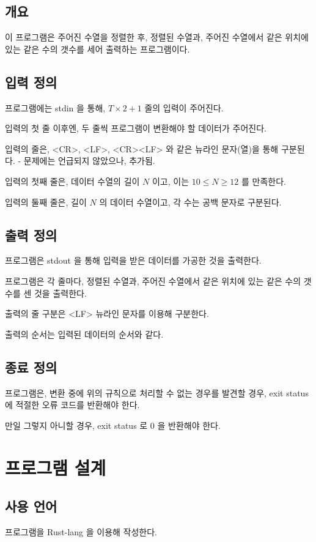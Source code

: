 \documentclass {article}
\begin{document}
\subsection {개요}
이 프로그램은 주어진 수열을 정렬한 후, 정렬된 수열과, 주어진 수열에서 같은 위치에 있는 같은 수의 갯수를 세어 출력하는 프로그램이다.

\subsection {입력 정의}
프로그램에는 stdin 을 통해, $T \times 2 + 1$ 줄의 입력이 주어진다.

입력의 첫 줄 이후엔, 두 줄씩 프로그램이 변환해야 할 데이터가 주어진다.

입력의 줄은, <CR>, <LF>, <CR><LF> 와 같은 뉴라인 문자(열)을 통해 구분된다. - 문제에는 언급되지 않았으나, 추가됨.

입력의 첫째 줄은, 데이터 수열의 길이 $N$ 이고, 이는 $10 \le N \ge 12$ 를 만족한다.

입력의 둘째 줄은, 길이 $N$ 의 데이터 수열이고, 각 수는 공백 문자로 구분된다.

\subsection {출력 정의}
프로그램은 stdout 을 통해 입력을 받은 데이터를 가공한 것을 출력한다.

프로그램은 각 줄마다, 정렬된 수열과, 주어진 수열에서 같은 위치에 있는 같은 수의 갯수를 센 것을 출력한다.

출력의 줄 구분은 <LF> 뉴라인 문자를 이용해 구분한다.

출력의 순서는 입력된 데이터의 순서와 같다.

\subsection {종료 정의}
프로그램은, 변환 중에 위의 규칙으로 처리할 수 없는 경우를 발견할 경우,
exit status 에 적절한 오류 코드를 반환해야 한다.

만일 그렇지 아니할 경우, exit status 로 0 을 반환해야 한다.

\section {프로그램 설계}
\subsection {사용 언어}
프로그램을 Rust-lang 을 이용해 작성한다.
\end{document}
